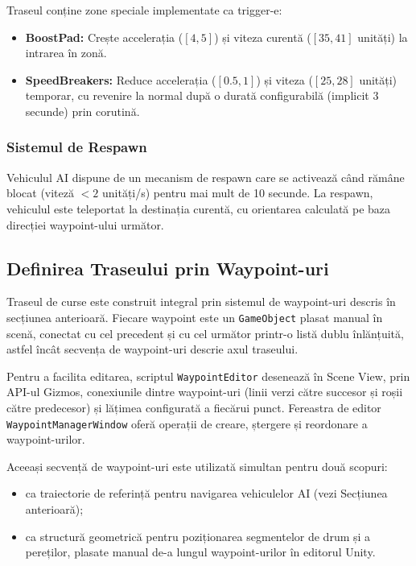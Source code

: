 \documentclass[11pt,twocolumn]{article}
\begin{document}
Traseul conține zone speciale implementate ca trigger-e:

\begin{itemize}
    \item \textbf{BoostPad:} Crește accelerația ($[4, 5]$) și viteza curentă ($[35, 41]$ unități) la intrarea în zonă.
    \item \textbf{SpeedBreakers:} Reduce accelerația ($[0.5, 1]$) și viteza ($[25, 28]$ unități) temporar, cu revenire la normal după o durată configurabilă (implicit 3 secunde) prin corutină.
\end{itemize}

\subsubsection{Sistemul de Respawn}

Vehiculul AI dispune de un mecanism de respawn care se activează când rămâne blocat (viteză $< 2$ unități/s) pentru mai mult de 10 secunde. La respawn, vehiculul este teleportat la destinația curentă, cu orientarea calculată pe baza direcției waypoint-ului următor.

\subsection{Definirea Traseului prin Waypoint-uri}

Traseul de curse este construit integral prin sistemul de waypoint-uri descris în secțiunea anterioară. Fiecare waypoint este un \texttt{GameObject} plasat manual în scenă, conectat cu cel precedent și cu cel următor printr-o listă dublu înlănțuită, astfel încât secvența de waypoint-uri descrie axul traseului.

Pentru a facilita editarea, scriptul \texttt{WaypointEditor} desenează în Scene View, prin API-ul Gizmos, conexiunile dintre waypoint-uri (linii verzi către succesor și roșii către predecesor) și lățimea configurată a fiecărui punct. Fereastra de editor \texttt{WaypointManagerWindow} oferă operații de creare, ștergere și reordonare a waypoint-urilor.

Aceeași secvență de waypoint-uri este utilizată simultan pentru două scopuri:
\begin{itemize}
    \item ca traiectorie de referință pentru navigarea vehiculelor AI (vezi Secțiunea anterioară);
    \item ca structură geometrică pentru poziționarea segmentelor de drum și a pereților, plasate manual de-a lungul waypoint-urilor în editorul Unity.
\end{itemize}
\end{document}
